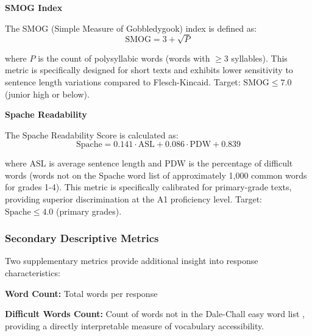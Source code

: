 \documentclass[10pt, a4paper]{article}
\begin{document}
\textbf{SMOG Index}

The SMOG (Simple Measure of Gobbledygook) index \cite{mclaughlin1969smog} is defined as:
$$
\text{SMOG} = 3 + \sqrt{P}
$$

where $P$ is the count of polysyllabic words (words with $\geq 3$ syllables). This metric is specifically designed for short texts and exhibits lower sensitivity to sentence length variations compared to Flesch-Kincaid. Target: $\text{SMOG} \leq 7.0$ (junior high or below).

\textbf{Spache Readability}

The Spache Readability Score \cite{spache1953new} is calculated as:
$$
\text{Spache} = 0.141 \cdot \text{ASL} + 0.086 \cdot \text{PDW} + 0.839
$$

where $\text{ASL}$ is average sentence length and $\text{PDW}$ is the percentage of difficult words (words not on the Spache word list of approximately 1,000 common words for grades 1-4). This metric is specifically calibrated for primary-grade texts, providing superior discrimination at the A1 proficiency level. Target: $\text{Spache} \leq 4.0$ (primary grades).



\subsubsection{Secondary Descriptive Metrics}
Two supplementary metrics provide additional insight into response characteristics:

\textbf{Word Count:} Total words per response

\textbf{Difficult Words Count:} Count of words not in the Dale-Chall easy word list \cite{dale1948formula}, providing a directly interpretable measure of vocabulary accessibility.



\end{document}
